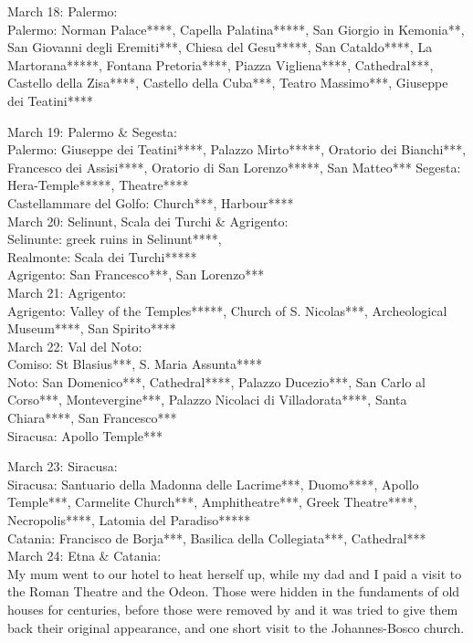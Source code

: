 March 18: Palermo:\\
Palermo: Norman Palace****, Capella Palatina*****, San Giorgio in Kemonia**, San Giovanni degli Eremiti***, Chiesa del Gesu*****, San Cataldo****, La Martorana*****, Fontana Pretoria****, Piazza Vigliena****, Cathedral***, Castello della Zisa****, Castello della Cuba***, Teatro Massimo***, Giuseppe dei Teatini****

March 19: Palermo \& Segesta:\\
Palermo: Giuseppe dei Teatini****, Palazzo Mirto*****, Oratorio dei Bianchi***, Francesco dei Assisi****, Oratorio di San Lorenzo*****, San Matteo***
Segesta: Hera-Temple*****, Theatre****\\
Castellammare del Golfo: Church***, Harbour****\\

March 20: Selinunt, Scala dei Turchi \& Agrigento:\\
Selinunte: greek ruins in Selinunt****,\\
Realmonte: Scala dei Turchi*****\\
Agrigento: San Francesco***, San Lorenzo***\\

March 21: Agrigento:\\
Agrigento: Valley of the Temples*****, Church of S. Nicolas***, Archeological Museum****, San Spirito****\\

March 22: Val del Noto:\\
Comiso: St Blasius***, S. Maria Assunta****\\
Noto: San Domenico***, Cathedral****, Palazzo Ducezio***, San Carlo al Corso***, Montevergine***, Palazzo Nicolaci di Villadorata****, Santa Chiara****, San Francesco***\\
Siracusa: Apollo Temple***

March 23: Siracusa:\\
Siracusa: Santuario della Madonna delle Lacrime***, Duomo****, Apollo Temple***, Carmelite Church***, Amphitheatre***, Greek Theatre****, Necropolis****, Latomia del Paradiso*****\\
Catania: Francisco de Borja***, Basilica della Collegiata***, Cathedral***\\

March 24: Etna \& Catania:\\
My mum went to our hotel to heat herself up, while my dad and I paid a visit to the Roman Theatre and the Odeon. Those were hidden in the fundaments of old houses for centuries, before those were removed by and it was tried to give them back their original appearance, and one short visit to the Johannes-Bosco church.\\

